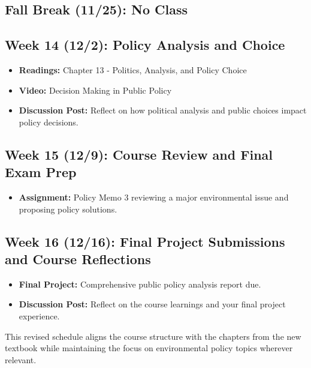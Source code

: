 \documentclass[12pt, letterpaper]{article}
\begin{document}
\subsection*{Fall Break (11/25): No Class}

\subsection*{Week 14 (12/2): Policy Analysis and Choice}
\begin{itemize}
    \item \textbf{Readings:} Chapter 13 - Politics, Analysis, and Policy Choice
    \item \textbf{Video:} Decision Making in Public Policy
    \item \textbf{Discussion Post:} Reflect on how political analysis and public choices impact policy decisions.
\end{itemize}

\subsection*{Week 15 (12/9): Course Review and Final Exam Prep}
\begin{itemize}
    \item \textbf{Assignment:} Policy Memo 3 reviewing a major environmental issue and proposing policy solutions.
\end{itemize}

\subsection*{Week 16 (12/16): Final Project Submissions and Course Reflections}
\begin{itemize}
    \item \textbf{Final Project:} Comprehensive public policy analysis report due.
    \item \textbf{Discussion Post:} Reflect on the course learnings and your final project experience.
\end{itemize}

This revised schedule aligns the course structure with the chapters from the new textbook while maintaining the focus on environmental policy topics wherever relevant.
\end{document}
